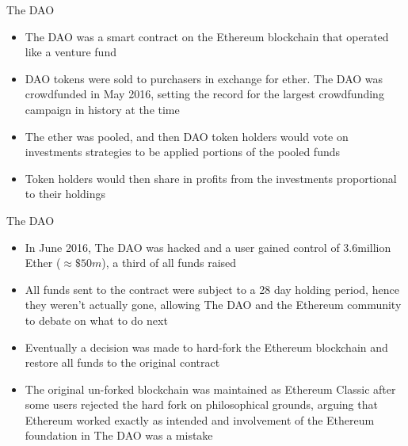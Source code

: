 \documentclass[11pt]{beamer}
\begin{document}

\begin{frame}{The DAO}
	\begin{itemize}
		\item The DAO was a smart contract on the Ethereum blockchain that operated like a venture fund
		\item DAO tokens were sold to purchasers in exchange for ether. The DAO was crowdfunded in May 2016, setting the record for the largest crowdfunding campaign in history at the time
		\item The ether was pooled, and then DAO token holders would vote on investments strategies to be applied portions of the pooled funds
		\item Token holders would then share in profits from the investments proportional to their holdings
	\end{itemize}
\end{frame}


\begin{frame}{The DAO}
	\begin{itemize}
		\item In June 2016, The DAO was hacked and a user gained control of 3.6million Ether ($\approx\$50m$), a third of all funds raised
		\item All funds sent to the contract were subject to a 28 day holding period, hence they weren't actually gone, allowing The DAO and the Ethereum community to debate on what to do next
		\item Eventually a decision was made to hard-fork the Ethereum blockchain and restore all funds to the original contract
		\item The original un-forked blockchain was maintained as Ethereum Classic after some users rejected the hard fork on philosophical grounds, arguing that Ethereum worked exactly as intended and  involvement of the Ethereum foundation in The DAO was a mistake
	\end{itemize}
\end{frame}

\end{document}
